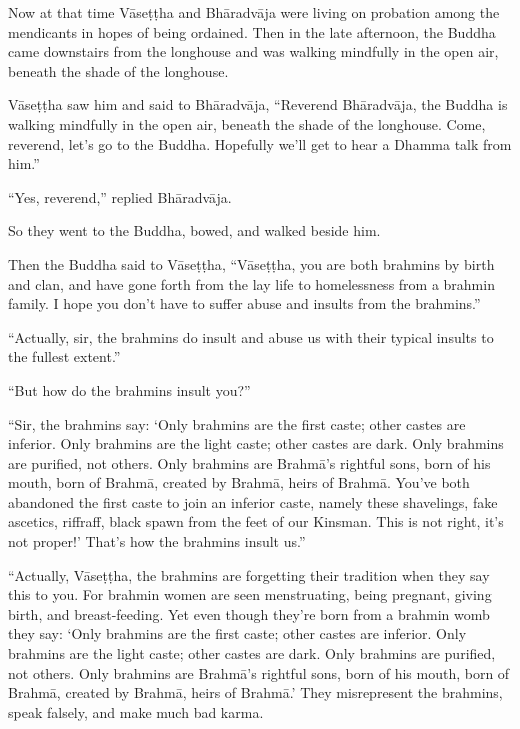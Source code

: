 \documentclass[12pt,openany]{book}%
\begin{document}
Now at that time \textsanskrit{Vāseṭṭha} and \textsanskrit{Bhāradvāja} were living on probation among the mendicants in hopes of being ordained. Then in the late afternoon, the Buddha came downstairs from the longhouse and was walking mindfully in the open air, beneath the shade of the longhouse. 

\textsanskrit{Vāseṭṭha} saw him and said to \textsanskrit{Bhāradvāja}, “Reverend \textsanskrit{Bhāradvāja}, the Buddha is walking mindfully in the open air, beneath the shade of the longhouse. Come, reverend, let’s go to the Buddha. Hopefully we’ll get to hear a Dhamma talk from him.” 

“Yes, reverend,” replied \textsanskrit{Bhāradvāja}. 

So they went to the Buddha, bowed, and walked beside him. 

Then the Buddha said to \textsanskrit{Vāseṭṭha}, “\textsanskrit{Vāseṭṭha}, you are both brahmins by birth and clan, and have gone forth from the lay life to homelessness from a brahmin family. I hope you don’t have to suffer abuse and insults from the brahmins.” 

“Actually, sir, the brahmins do insult and abuse us with their typical insults to the fullest extent.” 

“But how do the brahmins insult you?” 

“Sir, the brahmins say: ‘Only brahmins are the first caste; other castes are inferior. Only brahmins are the light caste; other castes are dark. Only brahmins are purified, not others. Only brahmins are \textsanskrit{Brahmā}’s rightful sons, born of his mouth, born of \textsanskrit{Brahmā}, created by \textsanskrit{Brahmā}, heirs of \textsanskrit{Brahmā}. You’ve both abandoned the first caste to join an inferior caste, namely these shavelings, fake ascetics, riffraff, black spawn from the feet of our Kinsman. This is not right, it’s not proper!’ That’s how the brahmins insult us.” 

“Actually, \textsanskrit{Vāseṭṭha}, the brahmins are forgetting their tradition when they say this to you. For brahmin women are seen menstruating, being pregnant, giving birth, and breast-feeding. Yet even though they’re born from a brahmin womb they say: ‘Only brahmins are the first caste; other castes are inferior. Only brahmins are the light caste; other castes are dark. Only brahmins are purified, not others. Only brahmins are \textsanskrit{Brahmā}’s rightful sons, born of his mouth, born of \textsanskrit{Brahmā}, created by \textsanskrit{Brahmā}, heirs of \textsanskrit{Brahmā}.’ They misrepresent the brahmins, speak falsely, and make much bad karma. 
\end{document}
